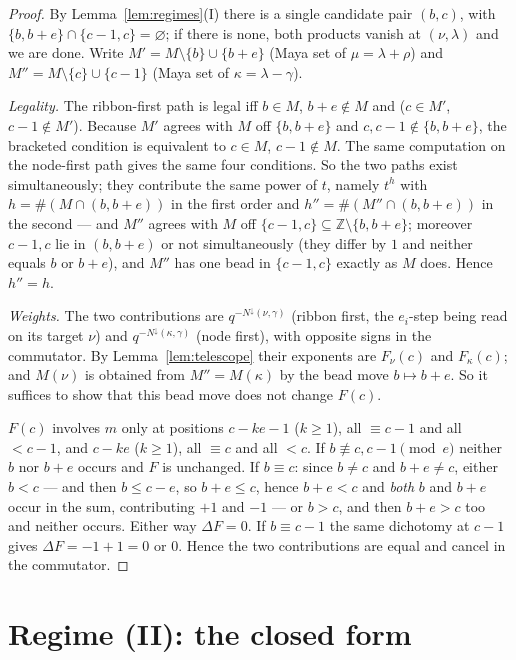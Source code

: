 \documentclass[11pt]{article}
\theoremstyle{plain}
\theoremstyle{definition}
\newcommand{\Z}{\mathbb{Z}}
\newcommand{\Nb}{N^{\downarrow}}
\begin{document}
\begin{proof}
By Lemma~\ref{lem:regimes}(I) there is a single candidate pair $(b,c)$, with
$\{b,b+e\}\cap\{c-1,c\}=\varnothing$; if there is none, both products vanish at
$(\nu,\lambda)$ and we are done. Write $M'=M\setminus\{b\}\cup\{b+e\}$ (Maya set of
$\mu=\lambda+\rho$) and $M''=M\setminus\{c\}\cup\{c-1\}$ (Maya set of
$\kappa=\lambda-\gamma$).

\emph{Legality.} The ribbon-first path is legal iff $b\in M$, $b+e\notin M$ and
($c\in M'$, $c-1\notin M'$). Because $M'$ agrees with $M$ off $\{b,b+e\}$ and
$c,c-1\notin\{b,b+e\}$, the bracketed condition is equivalent to $c\in M$,
$c-1\notin M$. The same computation on the node-first path gives the same four
conditions. So the two paths exist simultaneously; they contribute the same power of
$t$, namely $t^{h}$ with $h=\#(M\cap(b,b+e))$ in the first order and
$h''=\#(M''\cap(b,b+e))$ in the second --- and $M''$ agrees with $M$ off
$\{c-1,c\}\subseteq\Z\setminus\{b,b+e\}$; moreover $c-1,c$ lie in $(b,b+e)$ or not
simultaneously (they differ by $1$ and neither equals $b$ or $b+e$), and $M''$ has
one bead in $\{c-1,c\}$ exactly as $M$ does. Hence $h''=h$.

\emph{Weights.} The two contributions are $q^{-\Nb(\nu,\gamma)}$ (ribbon first, the
$e_i$-step being read on its target $\nu$) and $q^{-\Nb(\kappa,\gamma)}$ (node
first), with opposite signs in the commutator. By Lemma~\ref{lem:telescope} their
exponents are $F_{\nu}(c)$ and $F_{\kappa}(c)$; and $M(\nu)$ is obtained from
$M''=M(\kappa)$ by the bead move $b\mapsto b+e$. So it suffices to show that this
bead move does not change $F(c)$.

$F(c)$ involves $m$ only at positions $c-ke-1$ ($k\ge1$), all $\equiv c-1$ and all
$<c-1$, and $c-ke$ ($k\ge1$), all $\equiv c$ and all $<c$. If
$b\not\equiv c,c-1 \pmod e$ neither $b$ nor $b+e$ occurs and $F$ is unchanged.
If $b\equiv c$: since $b\ne c$ and $b+e\ne c$, either $b<c$ --- and then
$b\le c-e$, so $b+e\le c$, hence $b+e<c$ and \emph{both} $b$ and $b+e$ occur in the
sum, contributing $+1$ and $-1$ --- or $b>c$, and then $b+e>c$ too and neither
occurs. Either way $\Delta F=0$. If $b\equiv c-1$ the same dichotomy at $c-1$ gives
$\Delta F=-1+1=0$ or $0$. Hence the two contributions are equal and cancel in the
commutator.
\end{proof}

\section{Regime (II): the closed form}
\end{document}
